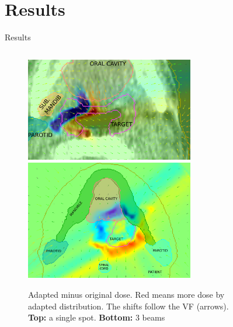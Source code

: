 \documentclass[pdf,dvipsnames,aspectratio=169]{beamer}
\begin{document}
\section{Results}
\begin{frame}[c]{Results}
    \vspace*{-0.5cm}
    \begin{columns}[c]
        \begin{column}{0.4\textwidth}
            \begin{figure}[h]
                \centering
                \includegraphics[width=0.75\textwidth]{imgs/annotated_beam_shift.png}\\
                \includegraphics[width=0.75\textwidth]{imgs/annotated_P3_F5.png}
                \caption{Adapted minus original dose. Red means more dose by adapted distribution. The shifts follow the VF (arrows). \textbf{Top:} a single spot. \textbf{Bottom:} 3 beams}
            \end{figure}
        \end{column}
        \begin{column}{0.6\textwidth}
            \begin{figure}[h]
                \begin{columns}[c]

\end{columns}
\end{figure}
\end{column}
\end{columns}
\end{frame}
\end{document}
